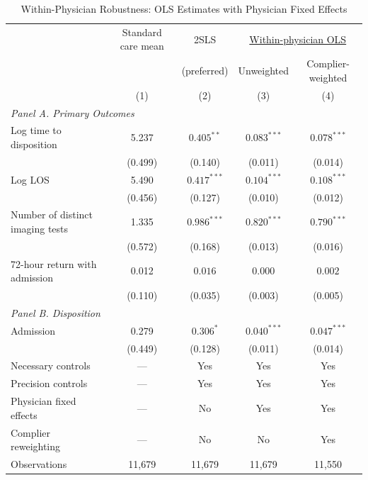 \documentclass[11pt]{article}
\newcommand{\1}{\hbox{\rm 1\kern-.35em 1}}
\begin{document}
\begin{table}[t!]
\centering
\caption{Within-Physician Robustness: OLS Estimates with Physician Fixed Effects}
\label{tab:wp_ols_results}
\begin{threeparttable}
\begin{tabular}{lcccc}
\toprule
& Standard care mean & 2SLS & \multicolumn{2}{c}{\underline{Within-physician OLS}} \\
& & (preferred) & Unweighted & Complier-weighted \\
& (1) & (2) & (3) & (4) \\
\midrule
\multicolumn{5}{l}{\textit{Panel A. Primary Outcomes}} \\[0.5em]
Log time to disposition 
& 5.237 
& $0.405^{**}$
& $0.083^{***}$ & $0.078^{***}$ \\
& (0.499)
& (0.140)
& (0.011) & (0.014) \\[0.5em]
Log LOS
& 5.490
& $0.417^{***}$
& $0.104^{***}$ & $0.108^{***}$ \\
& (0.456)
& (0.127)
& (0.010) & (0.012) \\[0.5em]
Number of distinct imaging tests 
& 1.335
& $0.986^{***}$
& $0.820^{***}$ & $0.790^{***}$ \\
& (0.572)
& (0.168)
& (0.013) & (0.016) \\[0.5em]
72-hour return with admission 
& 0.012
& $0.016$
& $0.000$ & $0.002$ \\
& (0.110)
& (0.035)
& (0.003) & (0.005) \\[0.5em]
\multicolumn{5}{l}{\textit{Panel B. Disposition}} \\[0.5em]
Admission 
& 0.279
& $0.306^{*}$
& $0.040^{***}$ & $0.047^{***}$ \\
& (0.449)
& (0.128)
& (0.011) & (0.014) \\[0.5em]
\midrule
Necessary controls       & --- & Yes & Yes & Yes \\
Precision controls       & --- & Yes & Yes & Yes \\
Physician fixed effects  & --- & No  & Yes & Yes \\
Complier reweighting     & --- & No  & No  & Yes \\
Observations             & 11,679 & 11,679 & 11,679 & 11,550 \\
\bottomrule
\end{tabular}
\begin{flushleft}
\footnotesize

\end{flushleft}
\end{threeparttable}
\end{table}
\end{document}
